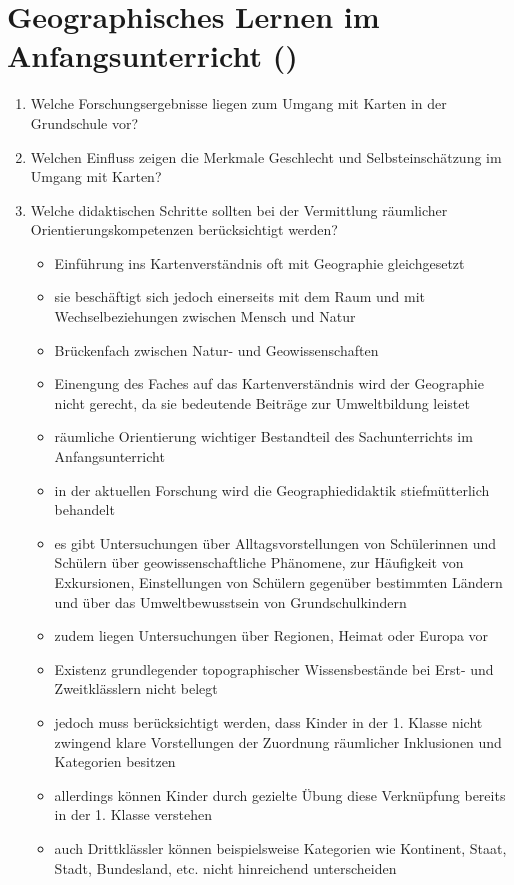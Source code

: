\section{Geographisches Lernen im Anfangsunterricht (\cite[S.\,159-176]{IH07})}
\begin{enumerate}
	\item{Welche Forschungsergebnisse liegen zum Umgang mit Karten in der Grundschule vor?}
	\item{Welchen Einfluss zeigen die Merkmale \glqq Geschlecht\grqq{} und \glqq Selbsteinschätzung\grqq{} im Umgang mit Karten?}
	\item{
		Welche didaktischen Schritte sollten bei der Vermittlung räumlicher Orientierungskompetenzen berücksichtigt werden?
		\begin{itemize}
			\item{Einführung ins Kartenverständnis oft mit Geographie gleichgesetzt}
			\item{sie beschäftigt sich jedoch einerseits mit dem Raum und mit Wechselbeziehungen zwischen Mensch und Natur}
			\item{Brückenfach zwischen Natur- und Geowissenschaften}
			\item{Einengung des Faches auf das Kartenverständnis wird der Geographie nicht gerecht, da sie bedeutende Beiträge zur Umweltbildung leistet}
			\item{räumliche Orientierung wichtiger Bestandteil des Sachunterrichts im Anfangsunterricht}
			\item{in der aktuellen Forschung wird die Geographiedidaktik stiefmütterlich behandelt}
			\item{es gibt Untersuchungen über Alltagsvorstellungen von Schülerinnen und Schülern über geowissenschaftliche Phänomene, zur Häufigkeit von Exkursionen, Einstellungen von Schülern gegenüber bestimmten Ländern und über das Umweltbewusstsein von Grundschulkindern}
			\item{zudem liegen Untersuchungen über Regionen, Heimat oder Europa vor}
			\item{Existenz grundlegender topographischer Wissensbestände bei Erst- und Zweitklässlern nicht belegt}
			\item{jedoch muss berücksichtigt werden, dass Kinder in der 1. Klasse nicht zwingend klare Vorstellungen der Zuordnung räumlicher Inklusionen und Kategorien besitzen}
			\item{allerdings können Kinder durch gezielte Übung diese Verknüpfung bereits in der 1. Klasse verstehen}
			\item{auch Drittklässler können beispielsweise Kategorien wie Kontinent, Staat, Stadt, Bundesland, etc. nicht hinreichend unterscheiden}

\end{itemize}}
\end{enumerate}
